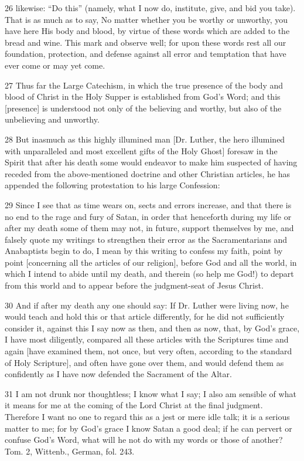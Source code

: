 26 likewise: “Do this” (namely, what I now do, institute, give, and bid you take). That is as much as to say, No matter whether you be worthy or unworthy, you have here His body and blood, by virtue of these words which are added to the bread and wine. This mark and observe well; for upon these words rest all our foundation, protection, and defense against all error and temptation that have ever come or may yet come.

27 Thus far the Large Catechism, in which the true presence of the body and blood of Christ in the Holy Supper is established from God’s Word; and this [presence] is understood not only of the believing and worthy, but also of the unbelieving and unworthy.

28 But inasmuch as this highly illumined man [Dr. Luther, the hero illumined with unparalleled and most excellent gifts of the Holy Ghost] foresaw in the Spirit that after his death some would endeavor to make him suspected of having receded from the above-mentioned doctrine and other Christian articles, he has appended the following protestation to his large Confession:

29 Since I see that as time wears on, sects and errors increase, and that there is no end to the rage and fury of Satan, in order that henceforth during my life or after my death some of them may not, in future, support themselves by me, and falsely quote my writings to strengthen their error as the Sacramentarians and Anabaptists begin to do, I mean by this writing to confess my faith, point by point [concerning all the articles of our religion], before God and all the world, in which I intend to abide until my death, and therein (so help me God!) to depart from this world and to appear before the judgment-seat of Jesus Christ.

30 And if after my death any one should say: If Dr. Luther were living now, he would teach and hold this or that article differently, for he did not sufficiently consider it, against this I say now as then, and then as now, that, by God’s grace, I have most diligently, compared all these articles with the Scriptures time and again [have examined them, not once, but very often, according to the standard of Holy Scripture], and often have gone over them, and would defend them as confidently as I have now defended the Sacrament of the Altar.

31 I am not drunk nor thoughtless; I know what I say; I also am sensible of what it means for me at the coming of the Lord Christ at the final judgment. Therefore I want no one to regard this as a jest or mere idle talk; it is a serious matter to me; for by God’s grace I know Satan a good deal; if he can pervert or confuse God’s Word, what will he not do with my words or those of another? Tom. 2, Wittenb., German, fol. 243.

